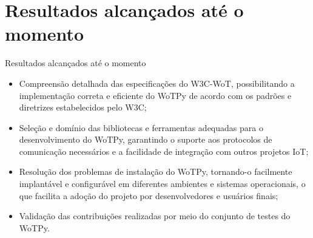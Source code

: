 \section{Resultados alcançados até o momento}

\begin{frame}{Resultados alcançados até o momento}
    \begin{itemize}
    \item Compreensão detalhada das especificações do W3C-WoT, possibilitando a implementação correta e eficiente do WoTPy de acordo com os padrões e diretrizes estabelecidos pelo W3C;
    \item Seleção e domínio das bibliotecas e ferramentas adequadas para o desenvolvimento do WoTPy, garantindo o suporte aos protocolos de comunicação necessários e a facilidade de integração com outros projetos IoT;
    \item Resolução dos problemas de instalação do WoTPy, tornando-o facilmente implantável e configurável em diferentes ambientes e sistemas operacionais, o que facilita a adoção do projeto por desenvolvedores e usuários finais;
    \item Validação das contribuições realizadas por meio do conjunto de testes do WoTPy.
    \end{itemize}
\end{frame}
